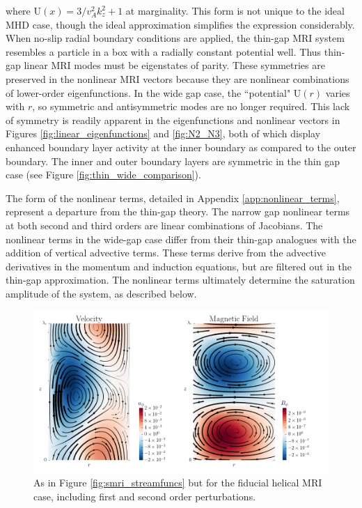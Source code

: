 \documentclass{emulateapj}
\begin{document}
where $\mathrm{U}(x) = {3}/{v_A^2 k_z^2} + 1$ at marginality. This form is not unique to the ideal MHD case, though the ideal approximation simplifies the expression considerably. When no-slip radial boundary conditions are applied, the thin-gap MRI system resembles a particle in a box with a radially constant potential well. Thus thin-gap linear MRI modes must be eigenstates of parity. These symmetries are preserved in the nonlinear MRI vectors because they are nonlinear combinations of lower-order eigenfunctions. In the wide gap case, the ``potential" $\mathrm{U}(r)$ varies with $r$, so symmetric and antisymmetric modes are no longer required. This lack of symmetry is readily apparent in the eigenfunctions and nonlinear vectors in Figures \ref{fig:linear_eigenfunctions} and \ref{fig:N2_N3}, both of which display enhanced boundary layer activity at the inner boundary as compared to the outer boundary. The inner and outer boundary layers are symmetric in the thin gap case (see Figure \ref{fig:thin_wide_comparison}).

The form of the nonlinear terms, detailed in Appendix \ref{app:nonlinear_terms}, represent a departure from the thin-gap theory. The narrow gap nonlinear terms at both second and third orders are linear combinations of Jacobians. The nonlinear terms in the wide-gap case differ from their thin-gap analogues with the addition of vertical advective terms. These terms derive from the advective derivatives in the momentum and induction equations, but are filtered out in the thin-gap approximation. The nonlinear terms ultimately determine the saturation amplitude of the system, as described below.

\begin{figure}
\centering
\includegraphics[width=\textwidth]{../figures/hmri_velocity_Bfield_streamfuncs.png}
\caption{As in Figure \ref{fig:smri_streamfuncs} but for the fiducial helical MRI case, including first and second order perturbations.}
\end{figure}
\end{document}
